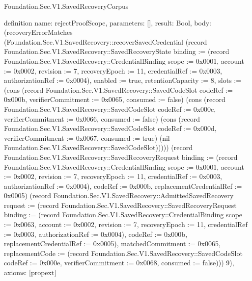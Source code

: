 \begin{lexlean}{Foundation.Sec.V1.SavedRecoveryCorpus}
\begin{semanticmodule}
definition{
  name: rejectProofScope,
  parameters: [],
  result: Bool,
  body: (recoveryErrorMatches (Foundation.Sec.V1.SavedRecovery::recoverSavedCredential (record Foundation.Sec.V1.SavedRecovery::SavedRecoveryState {binding := (record Foundation.Sec.V1.SavedRecovery::CredentialBinding {scope := 0x0001, account := 0x0002, revision := 7, recoveryEpoch := 11, credentialRef := 0x0003, authorizationRef := 0x0004}), enabled := true, retentionCapacity := 8, slots := (cons (record Foundation.Sec.V1.SavedRecovery::SavedCodeSlot {codeRef := 0x000b, verifierCommitment := 0x0065, consumed := false}) (cons (record Foundation.Sec.V1.SavedRecovery::SavedCodeSlot {codeRef := 0x000c, verifierCommitment := 0x0066, consumed := false}) (cons (record Foundation.Sec.V1.SavedRecovery::SavedCodeSlot {codeRef := 0x000d, verifierCommitment := 0x0067, consumed := true}) (nil Foundation.Sec.V1.SavedRecovery::SavedCodeSlot))))}) (record Foundation.Sec.V1.SavedRecovery::SavedRecoveryRequest {binding := (record Foundation.Sec.V1.SavedRecovery::CredentialBinding {scope := 0x0001, account := 0x0002, revision := 7, recoveryEpoch := 11, credentialRef := 0x0003, authorizationRef := 0x0004}), codeRef := 0x000b, replacementCredentialRef := 0x0005}) (record Foundation.Sec.V1.SavedRecovery::AdmittedSavedRecovery {request := (record Foundation.Sec.V1.SavedRecovery::SavedRecoveryRequest {binding := (record Foundation.Sec.V1.SavedRecovery::CredentialBinding {scope := 0x0063, account := 0x0002, revision := 7, recoveryEpoch := 11, credentialRef := 0x0003, authorizationRef := 0x0004}), codeRef := 0x000b, replacementCredentialRef := 0x0005}), matchedCommitment := 0x0065, replacementCode := (record Foundation.Sec.V1.SavedRecovery::SavedCodeSlot {codeRef := 0x000e, verifierCommitment := 0x0068, consumed := false})})) 9),
  axioms: [propext]
}


\end{semanticmodule}
\end{lexlean}
